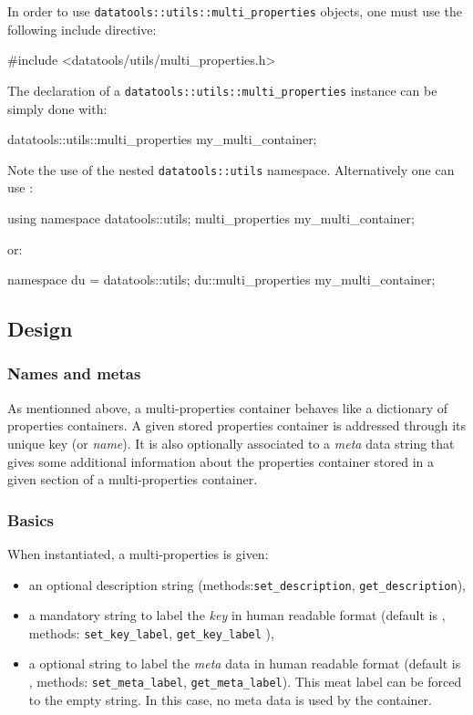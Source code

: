 \pn  In   order  to  use  \texttt{datatools::utils::multi\_properties}
objects, one must use the following include directive:
\begin{CppVerbatim} 
#include <datatools/utils/multi_properties.h>
\end{CppVerbatim}

\pn The  declaration of a \texttt{datatools::utils::multi\_properties}
instance can be simply done with:
\begin{CppVerbatim} 
datatools::utils::multi_properties my_multi_container;
\end{CppVerbatim}
\pn Note  the use  of the nested  \texttt{datatools::utils} namespace.
Alternatively one can use :
\begin{CppVerbatim} 
using namespace datatools::utils;
multi_properties my_multi_container;
\end{CppVerbatim}
\pn or:
\begin{CppVerbatim} 
namespace du = datatools::utils;
du::multi_properties my_multi_container;
\end{CppVerbatim}

\subsection{Design}

\subsubsection{Names and metas}

\pn As  mentionned above, a multi-properties container  behaves like a
dictionary  of  properties  containers.   A  given  stored  properties
container is addressed through its unique key (or \emph{name}).  It is
also  optionally associated to  a \emph{meta}  data string  that gives
some additional information about the properties container stored in a
given section of a multi-properties container.

\subsubsection{Basics}

\pn When instantiated, a multi-properties is given:
\begin{itemize}

\item          an         optional          description         string
  (methods:\texttt{set\_description}, \texttt{get\_description}),

\item a  mandatory string  to label the  \emph{key} in  human readable
  format  (default  is  , methods:  \texttt{set\_key\_label},
  \texttt{get\_key\_label} ),

\item  a  optional string  to  label  the  \emph{meta} data  in  human
  readable     format      (default     is     ,     methods:
  \texttt{set\_meta\_label},   \texttt{get\_meta\_label}).  This  meat
  label can be forced to the empty string.  In this case, no meta data
  is used by the container.

\end{itemize}

